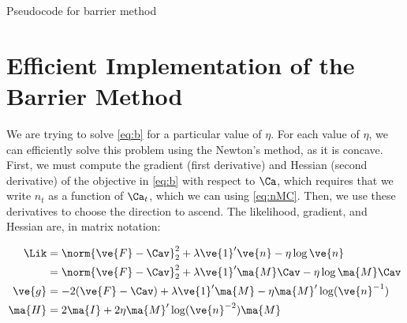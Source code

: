 \begin{table}[h]
\caption{Pseudocode for barrier method}
\label{tab:bar}
\end{table}

\section{Efficient Implementation of the Barrier Method} \label{sec:bar}

We are trying to solve \eqref{eq:b} for a particular value of $\eta$.  For each value of $\eta$, we can efficiently solve this problem using the Newton's method, as it is concave. First, we must compute the gradient (first derivative) and Hessian (second derivative) of the objective in \eqref{eq:b} with respect to $\Ca$, which requires that we write $n_t$ as a function of $\Ca_t$, which we can using \eqref{eq:nMC}. Then, we use these derivatives to choose the direction to ascend. The likelihood, gradient, and Hessian are, in matrix notation:

\begin{align}
\Lik &= \norm{\ve{F}-\Cav}^2_2 + \lambda \ve{1}' \ve{n} - \eta \log \ve{n}\\
&= \norm{\ve{F}-\Cav}^2_2 + \lambda \ve{1}' \ma{M} \Cav - \eta \log \ma{M} \Cav\\
\ve{g} &= -2(\ve{F}-\Cav) +\lambda \ve{1}' \ma{M} - \eta \ma{M}' \log (\ve{n}^{-1}) \label{eq:g}\\
\ma{H} &= 2\ma{I} + 2 \eta \ma{M}' \log(\ve{n}^{-2}) \ma{M} \label{eq:H}
\end{align}

